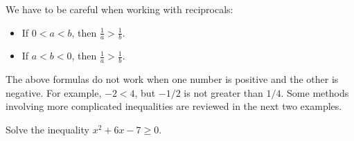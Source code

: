 \documentclass{ximera}
\begin{document}
We have to be careful when working with reciprocals:

\begin{itemize}
  \item If $0 < a < b$, then $\displaystyle \frac{1}{a} > \frac{1}{b}$.

  \item If $a < b < 0$, then $\displaystyle \frac{1}{a} > \frac{1}{b}$.
\end{itemize}

The above formulas do not work when one number is positive and the other is negative.  For example, $-2 < 4$, but $-1/2$ is not greater than $1/4$.
Some methods involving more complicated inequalities are reviewed in the next two examples.

\begin{example}
Solve the inequality $x^2 + 6x - 7 \geq 0$.
\end{example}
\end{document}

